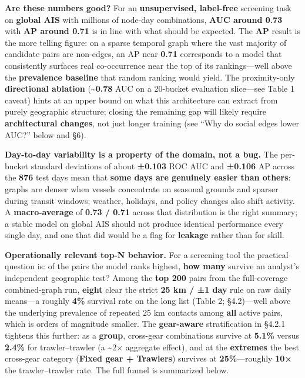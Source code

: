 \documentclass[
]{article}
\begin{document}
\textbf{Are these numbers good?} For an \textbf{unsupervised,
label-free} screening task on \textbf{global AIS} with millions of
node-day combinations, \textbf{AUC around 0.73} with \textbf{AP around
0.71} is in line with what should be expected. The \textbf{AP} result is
the more telling figure: on a sparse temporal graph where the vast
majority of candidate pairs are non-edges, an AP near \textbf{0.71}
corresponds to a model that consistently surfaces real co-occurrence
near the top of its rankings---well above the \textbf{prevalence
baseline} that random ranking would yield. The proximity-only
\textbf{directional ablation} (\textasciitilde{}\textbf{0.78} AUC on a
20-bucket evaluation slice---see Table 1 caveat) hints at an upper bound
on what this architecture can extract from purely geographic structure;
closing the remaining gap will likely require \textbf{architectural
changes}, not just longer training (see ``Why do social edges lower
AUC?'' below and §6).

\textbf{Day-to-day variability is a property of the domain, not a bug.}
The per-bucket standard deviations of about \textbf{±0.103} ROC AUC and
\textbf{±0.106} AP across the \textbf{876} test days mean that
\textbf{some days are genuinely easier than others}: graphs are denser
when vessels concentrate on seasonal grounds and sparser during transit
windows; weather, holidays, and policy changes also shift activity. A
\textbf{macro-average} of \textbf{0.73 / 0.71} across that distribution
is the right summary; a stable model on global AIS should not produce
identical performance every single day, and one that did would be a flag
for \textbf{leakage} rather than for skill.

\textbf{Operationally relevant top-N behavior.} For a screening tool the
practical question is: of the pairs the model ranks highest, \textbf{how
many} survive an analyst's independent geographic test? Among the
\textbf{top 200} pairs from the full-coverage combined-graph run,
\textbf{eight} clear the strict \textbf{25 km / ±1 day} rule on raw
daily means---a roughly \textbf{4\%} survival rate on the long list
(Table 2; §4.2)---well above the underlying prevalence of repeated 25 km
contacts among \textbf{all} active pairs, which is orders of magnitude
smaller. The \textbf{gear-aware} stratification in §4.2.1 tightens this
further: as a \textbf{group}, cross-gear combinations survive at
\textbf{5.1\%} versus \textbf{2.4\%} for trawler--trawler (a
\textasciitilde2× aggregate effect), and at the \textbf{extremes} the
best cross-gear category (\textbf{Fixed gear + Trawlers}) survives at
\textbf{25\%}---roughly \textbf{10×} the trawler--trawler rate. The full
funnel is summarized below.
\end{document}

